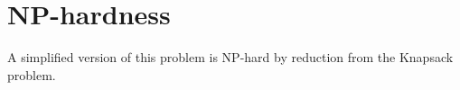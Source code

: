 \appendix

\section{NP-hardness}\label{sec:appendix-np-hardness}

A simplified version of this problem is NP-hard by reduction from the Knapsack problem.

